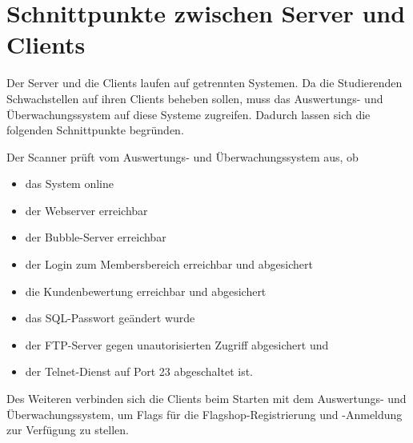 \section{Schnittpunkte zwischen Server und Clients}
\label{sec:Schnittpunkte_zwischen_Server_und_Clients}

Der Server und die Clients laufen auf getrennten Systemen. Da die Studierenden Schwachstellen auf ihren Clients beheben sollen, muss das Auswertungs- und Überwachungssystem auf diese Systeme zugreifen. Dadurch lassen sich die folgenden Schnittpunkte begründen.

Der Scanner prüft vom Auswertungs- und Überwachungssystem aus, ob 
\begin{itemize}
	\item das System online
	\item der Webserver erreichbar
	\item der Bubble-Server erreichbar
	\item der Login zum Membersbereich erreichbar und abgesichert
	\item die Kundenbewertung erreichbar und abgesichert
	\item das SQL-Passwort geändert wurde
	\item der FTP-Server gegen unautorisierten Zugriff abgesichert und
	\item der Telnet-Dienst auf Port 23 abgeschaltet ist. 
\end{itemize}

Des Weiteren verbinden sich die Clients beim Starten mit dem Auswertungs- und Überwachungssystem, um Flags für die Flagshop-Registrierung und -Anmeldung zur Verfügung zu stellen.